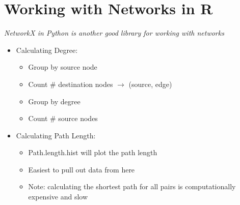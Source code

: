 \section{Working with Networks in R}
\textit{NetworkX in Python is another good library for working with networks}
\begin{itemize}
	\item Calculating Degree:
	\begin{itemize}
		\item Group by source node
		\item Count \# destination nodes $\rightarrow$ (source, edge)
		\item Group by degree
		\item Count \# source nodes
	\end{itemize}
	\item Calculating Path Length:
	\begin{itemize}
		\item Path.length.hist will plot the path length
		\item Easiest to pull out data from here
		\item Note: calculating the shortest path for all pairs is computationally expensive and slow
	\end{itemize}
\end{itemize}
